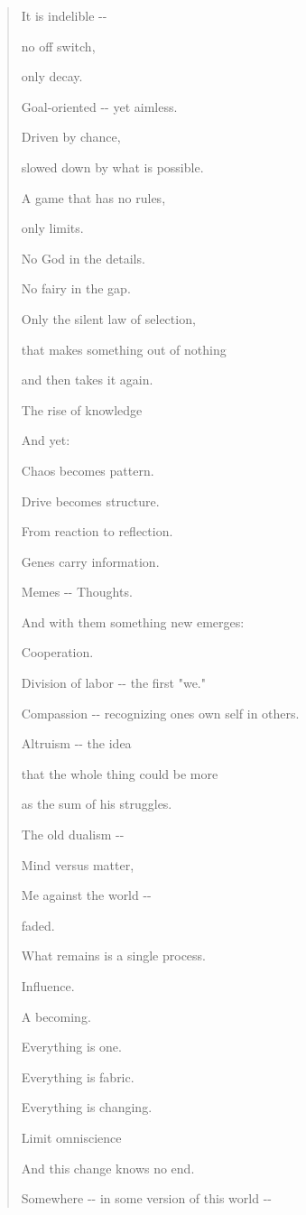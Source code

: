 \documentclass[
  ngerman,
]{article}
\begin{document}
\begin{quote}
It is indelible -\/-

no off switch,

only decay.

Goal-oriented -\/- yet aimless.

Driven by chance,

slowed down by what is possible.

A game that has no rules,

only limits.

No God in the details.

No fairy in the gap.

Only the silent law of selection,

that makes something out of nothing

and then takes it again.

The rise of knowledge

And yet:

Chaos becomes pattern.

Drive becomes structure.

From reaction to reflection.

Genes carry information.

Memes -\/- Thoughts.

And with them something new emerges:

Cooperation.

Division of labor -\/- the first "we."

Compassion -\/- recognizing one\textquotesingle s own self in others.

Altruism -\/- the idea

that the whole thing could be more

as the sum of his struggles.

The old dualism -\/-

Mind versus matter,

Me against the world -\/-

faded.

What remains is a single process.

Influence.

A becoming.

Everything is one.

Everything is fabric.

Everything is changing.

Limit omniscience

And this change knows no end.

Somewhere -\/- in some version of this world -\/-


\end{quote}
\end{document}
